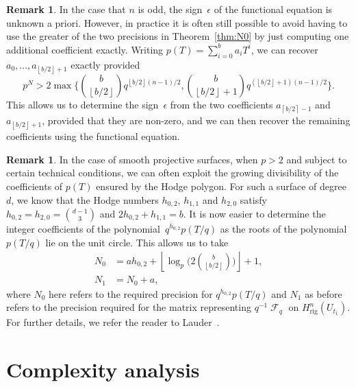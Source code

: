 \documentclass[a4paper,11pt]{article}
\numberwithin{equation}{section}
\providecommand{\floor}[1]{\left\lfloor#1\right\rfloor}   %
\providecommand{\ceil}[1]{\left\lceil#1\right\rceil}   %
\DeclareMathOperator{\Frob}{\mathcal{F}} %
\providecommand{\Hrig}{H_{\text{rig}}}  %
\theoremstyle{definition}
\newtheorem{rem}[thm]{Remark}
\begin{document}
\begin{rem}
In the case that $n$ is odd, the sign~$\epsilon$ of the functional 
equation is unknown a priori.  However, in practice it is often still 
possible to avoid having to use the greater of the two precisions in 
Theorem~\ref{thm:N0} by just computing one additional coefficient 
exactly.  Writing $p(T) = \sum_{i=0}^{b} a_i T^i$, we can recover 
$a_0, \dotsc, a_{\floor{b/2}+1}$ exactly provided 
\begin{equation}
p^N > 2 \max\biggl\{\binom{b}{\floor{b/2}} q^{\floor{b/2} (n-1) / 2}, 
                   \binom{b}{\floor{b/2}+1} q^{(\floor{b/2}+1) (n-1)/2} \biggr\}.
\end{equation}
This allows us to determine the sign~$\epsilon$ from the two 
coefficients $a_{\ceil{b/2}-1}$ and $a_{\floor{b/2}+1}$, provided 
that they are non-zero, and we can then recover the remaining 
coefficients using the functional equation.
\end{rem}

\begin{rem} \label{rem:N0Surfaces}
In the case of smooth projective surfaces, when $p > 2$ and subject to 
certain technical conditions, we can often exploit the growing divisibility 
of the coefficients of $p(T)$ ensured by the Hodge polygon.  For such a surface 
of degree~$d$, we know that the Hodge numbers $h_{0,2}$, $h_{1,1}$ and $h_{2,0}$ 
satisfy $h_{0,2} = h_{2,0} = \binom{d-1}{3}$ and $2 h_{0,2} + h_{1,1} = b$. 
It is now easier to determine the integer coefficients of the 
polynomial~$q^{h_{0,2}} p(T/q)$ as the roots of the polynomial $p(T/q)$ lie 
on the unit circle.  This allows us to take 
\begin{align*}
N_0 & = a h_{0,2} + \floor{\log_p \biggl( 2 \binom{b}{\floor{b/2}}\biggr)} + 1,\\
N_1 & = N_0 + a,
\end{align*}
where $N_0$ here refers to the required precision for $q^{h_{0,2}} p(T/q)$ 
and $N_1$ as before refers to the precision required for the matrix 
representing $q^{-1} \Frob_q$ on $\Hrig^{n}(U_{t_1})$.
For further details, we refer the reader to 
Lauder~\citep[\S 9.3.2, Proposition~9.6]{Lauder2006}.
\end{rem}


\section{Complexity analysis}
\label{sec:Complexity}
\end{document}
